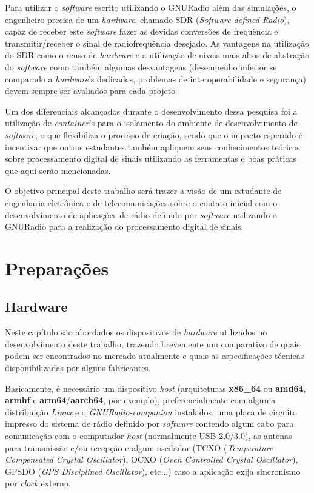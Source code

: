 \documentclass[
  12pt,				%
  openright,			%
  twoside,			%
  a4paper,			%
  english,			%
  french,				%
  spanish,			%
  brazil,				%
  ]{abntex2}
\begin{document}
Para utilizar o \textit{software} escrito utilizando o GNURadio além das simulações, o engenheiro precisa de um \textit{hardware}, chamado SDR (\textit{Software-defined Radio}), capaz de receber este \textit{software} fazer as devidas
conversões de frequência e transmitir/receber o sinal de radiofrequência desejado. As vantagens na utilização do SDR como o reuso de \textit{hardware} e a utilização de níveis mais altos de abstração do \textit{software} como também algumas desvantagens (desempenho inferior
se comparado a \textit{hardware}'s dedicados,  problemas  de  interoperabilidade e segurança) devem sempre ser avaliados para cada projeto \cite{sbrc:minicurso_gnuradio}

Um dos diferenciais alcançados durante o desenvolvimento dessa pesquisa foi a utilização de \textit{container}'s para o isolamento do ambiente de desenvolvimento de \textit{software}, o que
flexibiliza o processo de criação, sendo que o impacto esperado é incentivar que outros estudantes também apliquem seus conhecimentos teóricos sobre processamento digital de sinais
utilizando as ferramentas e boas práticas que aqui serão mencionadas.

O objetivo principal deste trabalho será trazer a visão de um estudante de engenharia eletrônica e de telecomunicações sobre o contato inicial com o desenvolvimento de aplicações de rádio
definido por \textit{software} utilizando o GNURadio para a realização do processamento digital de sinais.

\part{Preparações}

\chapter{Hardware}

Neste capítulo são abordados os dispositivos de \textit{hardware} utilizados no desenvolvimento deste trabalho, trazendo brevemente um comparativo de quais
podem ser encontrados no mercado atualmente e quais as especificações técnicas disponibilizadas por alguns fabricantes.

Basicamente, é necessário um dispositivo \textit{host} (arquiteturas \textbf{x86\_64} ou \textbf{amd64}, \textbf{armhf} e \textbf{arm64}/\textbf{aarch64}, por exemplo),
preferencialmente com alguma distribuição \textit{Linux} e o \textit{GNURadio-companion} instalados, uma placa de circuito impresso do sistema de rádio
definido por \textit{software} contendo algum cabo para comunicação com o computador \textit{host} (normalmente USB 2.0/3.0), as antenas para transmissão e/ou recepção
e algum oscilador (TCXO (\textit{Temperature Compensated Crystal Oscillator}), OCXO (\textit{Oven Controlled Crystal Oscillator}), GPSDO (\textit{GPS Disciplined Oscillator}), etc...)
caso a aplicação exija sincronismo por \textit{clock} externo.
\end{document}
